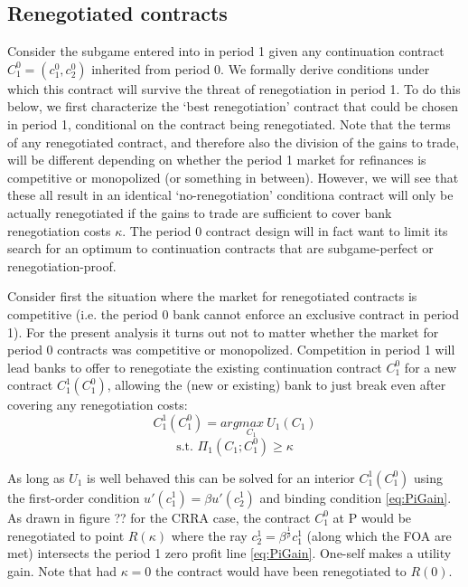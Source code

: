 \documentclass[11pt,english]{article}
\theoremstyle{plain}
\theoremstyle{definition}
\begin{document}
\subsection{Renegotiated contracts}

Consider the subgame entered into in period 1 given any continuation
contract $C_{1}^{0}=(c_{1}^{0},c_{2}^{0})$ inherited from period
0. We formally derive conditions under which this contract will survive
the threat of renegotiation in period 1. To do this below, we first
characterize the `best renegotiation' contract that could be chosen
in period 1, conditional on the contract being renegotiated. Note
that the terms of any renegotiated contract, and therefore also the
division of the gains to trade, will be different depending on whether
the period 1 market for refinances is competitive or monopolized (or
something in between). However, we will see that these all result
in an identical `no-renegotiation' condition\textendash a contract
will only be actually renegotiated if the gains to trade are sufficient
to cover bank renegotiation costs $\kappa$. The period 0 contract
design will in fact want to limit its search for an optimum to continuation
contracts that are subgame-perfect or renegotiation-proof.

Consider first the situation where the market for renegotiated contracts
is competitive (i.e. the period 0 bank cannot enforce an exclusive
contract in period 1). For the present analysis it turns out not to
matter whether the market for period 0 contracts was competitive or
monopolized. Competition in period 1 will lead banks to offer to renegotiate
the existing continuation contract $C_{1}^{0}$ for a new contract
$C_{1}^{1}(C_{1}^{0})$, allowing the (new or existing) bank to just
break even after covering any renegotiation costs: 
\begin{equation}
C_{1}^{1}(C_{1}^{0})=arg\underset{C_{1}}{max}\ U_{1}(C_{1})
\end{equation}
\begin{equation}
\text{s.t. }\Pi_{1}(C_{1};C_{1}^{0})\ge\kappa\label{eq:PiGain}
\end{equation}

As long as $U_{1}$ is well behaved this can be solved for
an interior $C_{1}^{1}(C_{1}^{0})$ using the first-order condition
$u'(c_{1}^{1})=\beta u'(c_{2}^{1})$ and binding condition \ref{eq:PiGain}.
As drawn in figure ?? for the CRRA case, the contract $C_{1}^{0}$
at P would be renegotiated to point $R(\kappa)$ where the ray 
$c_{2}^{1}=\beta^{\frac{1}{\rho}}c_{1}^{1}$
(along which the FOA are met) intersects the period 1 zero profit
line \ref{eq:PiGain}. One-self makes a utility gain. Note that had
$\kappa=0$ the contract would have been renegotiated to $R(0).$
\end{document}
